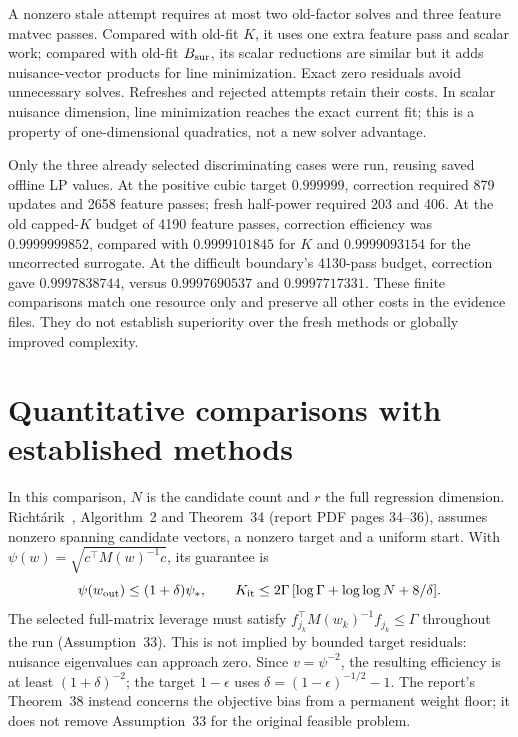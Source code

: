 \documentclass[11pt]{article}
\begin{document}
A nonzero stale attempt requires at most two old-factor solves and three feature matvec passes. Compared with old-fit $K$, it uses one extra feature pass and scalar work; compared with old-fit $B_{\rm sur}$, its scalar reductions are similar but it adds nuisance-vector products for line minimization. Exact zero residuals avoid unnecessary solves. Refreshes and rejected attempts retain their costs. In scalar nuisance dimension, line minimization reaches the exact current fit; this is a property of one-dimensional quadratics, not a new solver advantage.

Only the three already selected discriminating cases were run, reusing saved offline LP values. At the positive cubic target $0.999999$, correction required 879 updates and 2658 feature passes; fresh half-power required 203 and 406. At the old capped-$K$ budget of 4190 feature passes, correction efficiency was $0.9999999852$, compared with $0.9999101845$ for $K$ and $0.9999093154$ for the uncorrected surrogate. At the difficult boundary's 4130-pass budget, correction gave $0.9997838744$, versus $0.9997690537$ and $0.9997717331$. These finite comparisons match one resource only and preserve all other costs in the evidence files. They do not establish superiority over the fresh methods or globally improved complexity.

\section{Quantitative comparisons with established methods}
In this comparison, $N$ is the candidate count and $r$ the full regression dimension. Richt\'arik~\cite{richtarik2008}, Algorithm~2 and Theorem~34 (report PDF pages 34--36), assumes nonzero spanning candidate vectors, a nonzero target and a uniform start. With $\psi(w)=\sqrt{c^\top M(w)^{-1}c}$, its guarantee is
\[
 \psi(w_{\rm out})\le(1+\delta)\psi_*,\qquad
 K_{\rm it}\le2\Gamma\,[\log\Gamma+\log\log N+8/\delta].
\]
The selected full-matrix leverage must satisfy
$f_{j_k}^\top M(w_k)^{-1}f_{j_k}\le\Gamma$ throughout the run (Assumption~33). This is not implied by bounded target residuals: nuisance eigenvalues can approach zero. Since $v=\psi^{-2}$, the resulting efficiency is at least $(1+\delta)^{-2}$; the target $1-\epsilon$ uses $\delta=(1-\epsilon)^{-1/2}-1$. The report's Theorem~38 instead concerns the objective bias from a permanent weight floor; it does not remove Assumption~33 for the original feasible problem.
\end{document}
